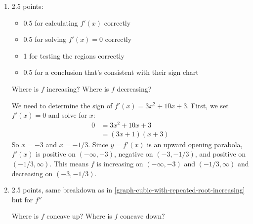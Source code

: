 \documentclass{article}
\begin{document}
\begin{enumerate}
\begin{enumerate}
    \begin{solution}
      The $x$-intercepts are $x=1$ and $x=-3$. The $y$-intercept
      is $y=-9$.
    \end{solution}

  \item \label{graph-cubic-with-repeated-root-increasing}

    \begin{grading}
      2.5 points:
      \begin{itemize}[nosep]
      \item 0.5 for calculating $f'(x)$ correctly
      \item 0.5 for solving $f'(x) = 0$ correctly
      \item 1 for testing the regions correctly
      \item 0.5 for a conclusion that's consistent with their sign chart
      \end{itemize}
    \end{grading}

    \begin{problem}[\nstretch{2}]
      Where is $f$ increasing? Where is $f$ decreasing?
    \end{problem}

    \begin{solution}
      We need to determine the sign of $f'(x) = 3x^2 + 10x + 3$. First,
      we set $f'(x)=0$ and solve for $x$:
      \begin{align*}
        0 &= 3x^2 + 10x + 3 \\
        &= (3x+1)(x+3)
      \end{align*}
      So $x=-3$ and $x=-1/3$. Since $y=f'(x)$ is an upward opening
      parabola, $f'(x)$ is positive on $(-\infty, -3)$, negative
      on $(-3, -1/3)$, and positive on $(-1/3, \infty)$. This means
      $f$ is increasing on $(-\infty, -3)$ and $(-1/3, \infty)$ and
      decreasing on $(-3, -1/3)$.
    \end{solution}

  \item \label{graph-cubic-with-repeated-root-concavity}

    \begin{grading}
      2.5 points, same breakdown as in \ref{graph-cubic-with-repeated-root-increasing} but for $f''$
    \end{grading}

    \begin{problem}[\vfill]
      Where is $f$ concave up? Where is $f$ concave down?
    \end{problem}


\end{enumerate}
\end{enumerate}
\end{document}
